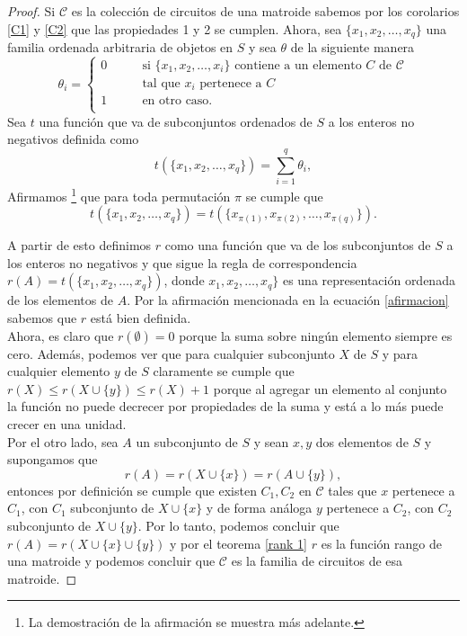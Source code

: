 \begin{proof}
Si $\mathcal{C}$ es la colección de circuitos de una matroide sabemos por los corolarios \ref{C1} y \ref{C2} que las propiedades 1 y 2 se cumplen. 
Ahora, sea $\{x_1,x_2,\dots,x_q\}$ una familia ordenada arbitraria de objetos en $S$ y sea $\theta$ de la siguiente manera 
$$\theta_{i}= 
\begin{cases}
0 & \qquad \text{si $\{x_1,x_2,\dots,x_i\}$ contiene a un elemento $C$ de $\mathcal{C}$} \\
& \qquad \text{tal que $x_i$ pertenece a $C$} \\
1 &\qquad\text{en otro caso.}\ \\ 
\end{cases} $$
Sea $t$ una función que va de subconjuntos ordenados de $S$ a los enteros no negativos definida como 
\begin{equation} \label{funcic}
t(\{x_1,x_2,\dots,x_q\}) = \sum_{i=1}^{q}\theta_i,
\end{equation}
Afirmamos \footnote{La demostración de la afirmación se muestra más adelante.} que para toda permutación $\pi$ se cumple que 
\begin{equation} \label{afirmacion}
t(\{x_1,x_2,\dots,x_q\}) = t(\{x_{\pi(1)},x_{\pi(2)},\dots,x_{\pi(q)}\}).
\end{equation}


A partir de esto definimos $r$ como una función que va de los subconjuntos de $S$ a los enteros no negativos y que sigue la regla de correspondencia $r(A) = t(\{x_1,x_2,\dots,x_q\})$, donde $x_1,x_2,\dots,x_q\}$ es una representación ordenada de los elementos de $A$. Por la afirmación mencionada en la ecuación \ref{afirmacion} sabemos que $r$ está bien definida. \\
Ahora, es claro que $r(\emptyset)=0$ porque la suma sobre ningún elemento siempre es cero. Además, podemos ver que para cualquier subconjunto $X$ de $S$ y para cualquier elemento $y$ de $S$ claramente se cumple que $r(X)\leq r(X \cup \{y\}) \leq r(X) + 1$ porque al agregar un elemento al conjunto la función no puede decrecer por propiedades de la suma y está a lo más puede crecer en una unidad. \\
Por el otro lado, sea $A$ un subconjunto de $S$ y sean $x,y$ dos elementos de $S$ y supongamos que 
$$r(A)= r(X \cup \{x\}) = r(A \cup \{y\}),$$
entonces por definición se cumple que existen $C_1,C_2$ en $\mathcal{C}$ tales que $x$ pertenece a $C_1$, con $C_1$ subconjunto de $X \cup \{x\}$ y de forma análoga $y$ pertenece a $C_2$, con $C_2$ subconjunto de $X \cup \{y\}$. Por lo tanto, podemos concluir que $r(A)= r(X \cup \{x\} \cup \{y\})$ y por el teorema \ref{rank 1} $r$ es la función rango de una matroide y podemos concluir que $\mathcal{C}$ es la familia de circuitos de esa matroide.
\end{proof}

